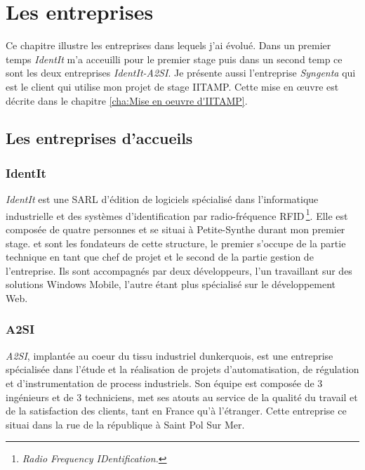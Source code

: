 \chapter{Les entreprises} %
\label{cha:Les entreprises}


\begin{it}

Ce chapitre illustre les entreprises dans lequels j'ai évolué. Dans un
premier temps \emph{IdentIt} m'a acceuilli pour le premier stage puis
dans un second temp ce sont les deux entreprises \emph{IdentIt-A2SI}. Je
présente aussi l'entreprise \emph{Syngenta} qui est le client qui
utilise mon projet de stage IITAMP. Cette mise en \oe{}uvre est décrite
dans le chapitre \ref{cha:Mise en oeuvre d'IITAMP}.

\end{it}

\section{Les entreprises d'accueils} %
\label{sec:Les entreprises d'aceuils}

\subsection{IdentIt} %
\label{sub:IdentIt}

\emph{IdentIt} est une SARL d'édition de logiciels spécialisé dans
l'informatique industrielle et des systèmes d'identification par
radio-fréquence RFID\,\footnote{\emph{Radio Frequency IDentification.}}.
Elle est composée de quatre personnes et se situai à Petite-Synthe
durant mon premier stage.  et  sont les
fondateurs de cette structure, le premier s'occupe de la partie
technique en tant que chef de projet et le second de la partie gestion
de l'entreprise. Ils sont accompagnés par deux développeurs, l'un
travaillant sur des solutions Windows Mobile, l'autre étant plus
spécialisé sur le développement Web.


\subsection{A2SI} %
\label{sub:A2SI}

\emph{A2SI}, implantée au coeur du tissu industriel dunkerquois, est une
entreprise spécialisée dans l’étude et la réalisation de projets
d’automatisation, de régulation et d’instrumentation de process
industriels. Son équipe est composée de 3 ingénieurs et de 3
techniciens, met ses atouts au service de la qualité du travail et de la
satisfaction des clients, tant en France qu’à l’étranger. Cette
entreprise ce situai dans la rue de la république à Saint Pol Sur Mer.


